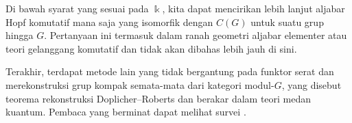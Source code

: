 Di bawah syarat yang sesuai pada $\Bbbk$, kita dapat mencirikan lebih lanjut
aljabar Hopf komutatif mana saja yang isomorfik dengan $C(G)$ untuk suatu grup
hingga $G$. Pertanyaan ini termasuk dalam ranah geometri aljabar elementer atau
teori gelanggang komutatif dan tidak akan dibahas lebih jauh di sini.

Terakhir, terdapat metode lain yang tidak bergantung pada funktor serat dan merekonstruksi grup kompak semata-mata dari kategori modul-$G$, yang disebut teorema rekonstruksi Doplicher--Roberts dan berakar dalam teori medan kuantum. Pembaca yang berminat dapat melihat survei \cite{Mu07}.
